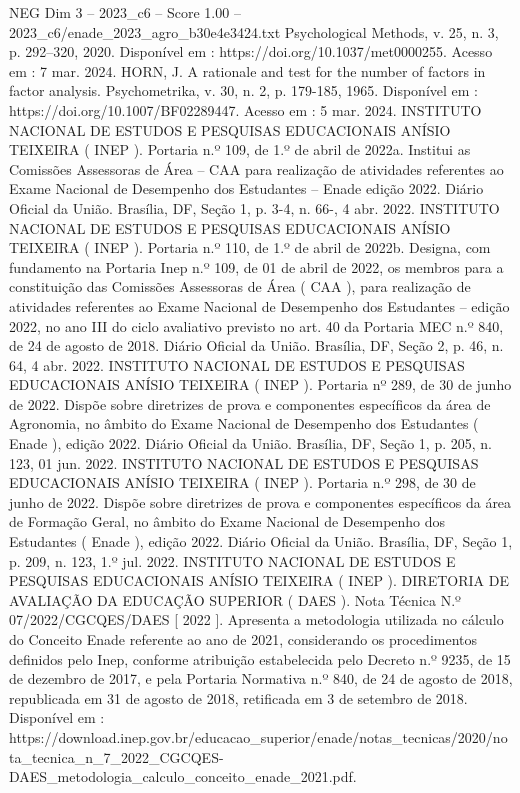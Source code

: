 \begin{textsample}{NEG Dim 3 – 2023\_c6 – Score 1.00 – 2023\_c6/enade\_2023\_agro\_b30e4e3424.txt}
Psychological Methods, v. 25, n. 3, p. 292–320, 2020.
Disponível em : https://doi.org/10.1037/met0000255.
Acesso em : 7 mar. 2024.
HORN, J.
A rationale and test for the number of factors in factor analysis.
Psychometrika, v. 30, n. 2, p. 179-185, 1965.
Disponível em : https://doi.org/10.1007/BF02289447.
Acesso em : 5 mar. 2024.
INSTITUTO NACIONAL DE ESTUDOS E PESQUISAS EDUCACIONAIS ANÍSIO TEIXEIRA ( INEP ).
Portaria n.º 109, de 1.º de abril de 2022a.
Institui as Comissões Assessoras de Área – CAA para realização de atividades referentes ao Exame Nacional de Desempenho dos Estudantes – Enade edição 2022.
Diário Oficial da União.
Brasília, DF, Seção 1, p. 3-4, n. 66-, 4 abr. 2022.
INSTITUTO NACIONAL DE ESTUDOS E PESQUISAS EDUCACIONAIS ANÍSIO TEIXEIRA ( INEP ).
Portaria n.º 110, de 1.º de abril de 2022b.
Designa, com fundamento na Portaria Inep n.º 109, de 01 de abril de 2022, os membros para a constituição das Comissões Assessoras de Área ( CAA ), para realização de atividades referentes ao Exame Nacional de Desempenho dos Estudantes – edição 2022, no ano III do ciclo avaliativo previsto no art. 40 da Portaria MEC n.º 840, de 24 de agosto de 2018.
Diário Oficial da União.
Brasília, DF, Seção 2, p. 46, n. 64, 4 abr. 2022.
INSTITUTO NACIONAL DE ESTUDOS E PESQUISAS EDUCACIONAIS ANÍSIO TEIXEIRA ( INEP ).
Portaria nº 289, de 30 de junho de 2022.
Dispõe sobre diretrizes de prova e componentes específicos da área de Agronomia, no âmbito do Exame Nacional de Desempenho dos Estudantes ( Enade ), edição 2022.
Diário Oficial da União.
Brasília, DF, Seção 1, p. 205, n. 123, 01 jun. 2022.
INSTITUTO NACIONAL DE ESTUDOS E PESQUISAS EDUCACIONAIS ANÍSIO TEIXEIRA ( INEP ).
Portaria n.º 298, de 30 de junho de 2022.
Dispõe sobre diretrizes de prova e componentes específicos da área de Formação Geral, no âmbito do Exame Nacional de Desempenho dos Estudantes ( Enade ), edição 2022.
Diário Oficial da União.
Brasília, DF, Seção 1, p. 209, n. 123, 1.º jul. 2022.
INSTITUTO NACIONAL DE ESTUDOS E PESQUISAS EDUCACIONAIS ANÍSIO TEIXEIRA ( INEP ).
DIRETORIA DE AVALIAÇÃO DA EDUCAÇÃO SUPERIOR ( DAES ).
Nota Técnica N.º 07/2022/CGCQES/DAES [ 2022 ].
Apresenta a metodologia utilizada no cálculo do Conceito Enade referente ao ano de 2021, considerando os procedimentos definidos pelo Inep, conforme atribuição estabelecida pelo Decreto n.º 9235, de 15 de dezembro de 2017, e pela Portaria Normativa n.º 840, de 24 de agosto de 2018, republicada em 31 de agosto de 2018, retificada em 3 de setembro de 2018.
Disponível em : https://download.inep.gov.br/educacao\_superior/enade/notas\_tecnicas/2020/nota\_tecnica\_n\_7\_2022\_CGCQES-DAES\_metodologia\_calculo\_conceito\_enade\_2021.pdf.

\end{textsample}
